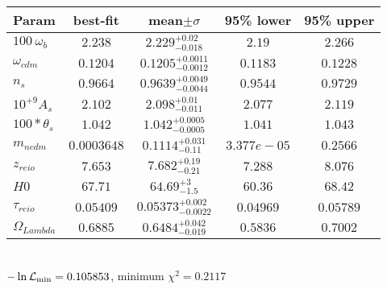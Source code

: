 \begin{tabular}{|l|c|c|c|c|} 
 \hline 
Param & best-fit & mean$\pm\sigma$ & 95\% lower & 95\% upper \\ \hline 
$100~\omega{}_{b }$ &$2.238$ & $2.229_{-0.018}^{+0.02}$ & $2.19$ & $2.266$ \\ 
$\omega{}_{cdm }$ &$0.1204$ & $0.1205_{-0.0012}^{+0.0011}$ & $0.1183$ & $0.1228$ \\ 
$n_{s }$ &$0.9664$ & $0.9639_{-0.0044}^{+0.0049}$ & $0.9544$ & $0.9729$ \\ 
$10^{+9}A_{s }$ &$2.102$ & $2.098_{-0.011}^{+0.01}$ & $2.077$ & $2.119$ \\ 
$100*\theta{}_{s }$ &$1.042$ & $1.042_{-0.0005}^{+0.0005}$ & $1.041$ & $1.043$ \\ 
$m_{ncdm }$ &$0.0003648$ & $0.1114_{-0.11}^{+0.031}$ & $3.377e-05$ & $0.2566$ \\ 
$z_{reio }$ &$7.653$ & $7.682_{-0.21}^{+0.19}$ & $7.288$ & $8.076$ \\ 
$H0$ &$67.71$ & $64.69_{-1.5}^{+3}$ & $60.36$ & $68.42$ \\ 
$\tau{}_{reio }$ &$0.05409$ & $0.05373_{-0.0022}^{+0.002}$ & $0.04969$ & $0.05789$ \\ 
$\Omega{}_{Lambda }$ &$0.6885$ & $0.6484_{-0.019}^{+0.042}$ & $0.5836$ & $0.7002$ \\ 
\hline 
 \end{tabular} \\ 
$-\ln{\cal L}_\mathrm{min} =0.105853$, minimum $\chi^2=0.2117$ \\ 
